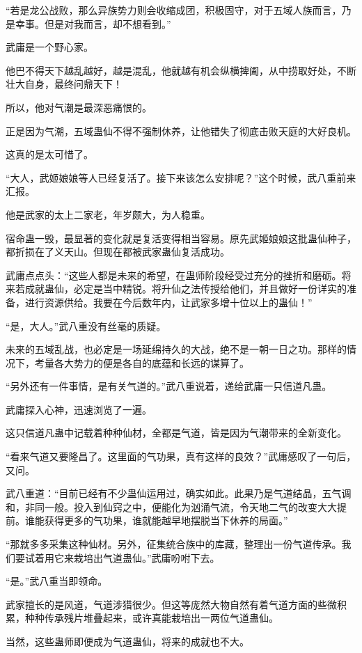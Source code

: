 \begin{this_body}
“若是龙公战败，那么异族势力则会收缩成团，积极固守，对于五域人族而言，乃是幸事。但是对我而言，却不想看到。”

武庸是一个野心家。

他巴不得天下越乱越好，越是混乱，他就越有机会纵横捭阖，从中捞取好处，不断壮大自身，最终问鼎天下！

所以，他对气潮是最深恶痛恨的。

正是因为气潮，五域蛊仙不得不强制休养，让他错失了彻底击败天庭的大好良机。

这真的是太可惜了。

“大人，武姬娘娘等人已经复活了。接下来该怎么安排呢？”这个时候，武八重前来汇报。

他是武家的太上二家老，年岁颇大，为人稳重。

宿命蛊一毁，最显著的变化就是复活变得相当容易。原先武姬娘娘这批蛊仙种子，都折损在了义天山。但现在都被武家蛊仙复活成功。

武庸点点头：“这些人都是未来的希望，在蛊师阶段经受过充分的挫折和磨砺。将来若成就蛊仙，必定是当中精锐。将升仙之法传授给他们，并且做好一份详实的准备，进行资源供给。我要在今后数年内，让武家多增十位以上的蛊仙！”

“是，大人。”武八重没有丝毫的质疑。

未来的五域乱战，也必定是一场延绵持久的大战，绝不是一朝一日之功。那样的情况下，考量各大势力的便是各自的底蕴和长远的谋算了。

“另外还有一件事情，是有关气道的。”武八重说着，递给武庸一只信道凡蛊。

武庸探入心神，迅速浏览了一遍。

这只信道凡蛊中记载着种种仙材，全都是气道，皆是因为气潮带来的全新变化。

“看来气道又要隆昌了。这里面的气功果，真有这样的良效？”武庸感叹了一句后，又问。

武八重道：“目前已经有不少蛊仙运用过，确实如此。此果乃是气道结晶，五气调和，非同一般。投入到仙窍之中，便能化为汹涌气流，令天地二气的改变大大提前。谁能获得更多的气功果，谁就能越早地摆脱当下休养的局面。”

“那就多多采集这种仙材。另外，征集统合族中的库藏，整理出一份气道传承。我们要试着用它来栽培出气道蛊仙。”武庸吩咐下去。

“是。”武八重当即领命。

武家擅长的是风道，气道涉猎很少。但这等庞然大物自然有着气道方面的些微积累，种种传承残片堆叠起来，或许真能栽培出一两位气道蛊仙。

当然，这些蛊师即便成为气道蛊仙，将来的成就也不大。


\end{this_body}
